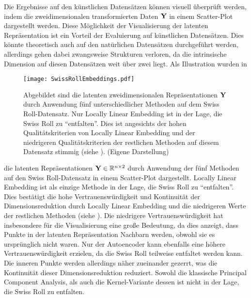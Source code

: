 Die Ergebnisse auf den künstlichen Datensätzen können visuell überprüft werden, indem die
zweidimensionalen transformierten Daten $\mat{Y}$ in einem Scatter-Plot dargestellt werden. Diese
Möglichkeit der Visualisierung der latenten Repräsentation ist ein Vorteil der Evaluierung auf
künstlichen Datensätzen. Dies könnte theoretisch auch auf den natürlichen Datensätzen durchgeführt
werden, allerdings gehen dabei zwangsweise Strukturen verloren, da die intrinsische Dimension auf
diesen Datensätzen weit über zwei liegt. Als Illustration wurden in
\begin{figure}[ht]
	\centering
	\texttt{[image: SwissRollEmbeddings.pdf]}
	\caption[Latente zweidimensionale Repräsentationen  $\mat{Y}$ durch Anwendung fünf unterschiedlicher Methoden auf dem Swiss Roll-Datensatzes]{Abgebildet sind die latenten zweidimensionalen Repräsentationen $\mat{Y}$ durch Anwendung fünf unterschiedlicher Methoden auf dem Swiss Roll-Datensatz. Nur Locally Linear Embedding ist in der Lage, die Swiss Roll zu \enquote{entfalten}. Dies ist angesichts der hohen Qualitätskriterien von Locally Linear Embedding und der niedrigeren Qualitätskriterien der restlichen Methoden auf diesem Datensatz stimmig (siehe ). (Eigene Darstellung)}
	\label{fig:SwissRollEmbeddings}
\end{figure}
die latenten Repräsentationen $\mathbf{Y} \in \mathbb{R}^{n \times 2}$ durch Anwendung der fünf Methoden auf den Swiss Roll-Datensatz in einem Scatter-Plot dargestellt.
Locally Linear Embedding ist als einzige Methode in der Lage, die Swiss Roll zu
\enquote{entfalten}. Dies bestätigt die hohe Vertrauenswürdigkeit und Kontinuität der
Dimensionsreduktion durch Locally Linear Embedding und die niedrigeren Werte der restlichen
Methoden (siehe ). Die niedrigere Vertrauenswürdigkeit hat
insbesondere für die Visualisierung eine große Bedeutung, da dies anzeigt, dass Punkte in der
latenten Repräsentation Nachbarn werden, obwohl sie es ursprünglich nicht waren. Nur der
Autoencoder kann ebenfalls eine höhere Vertrauenswürdigkeit erzielen, da die Swiss Roll teilweise
entfaltet werden kann. Die inneren Punkte werden allerdings näher zueinander gezerrt, was die
Kontinuität dieser Dimensionsreduktion reduziert. Sowohl die klassische Principal Component
Analysis, als auch die Kernel-Variante dessen ist nicht in der Lage, die Swiss Roll zu entfalten.

